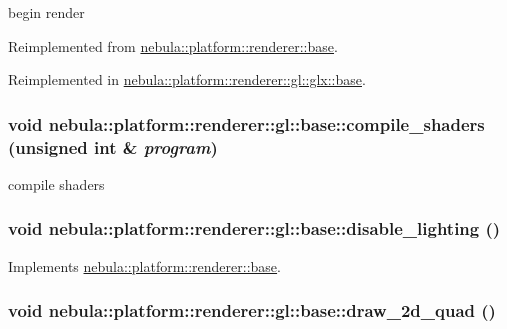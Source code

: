 begin render 

Reimplemented from \hyperlink{classnebula_1_1platform_1_1renderer_1_1base_a125a4fd0dfc31be859c37067eaada43d}{nebula::platform::renderer::base}.

Reimplemented in \hyperlink{classnebula_1_1platform_1_1renderer_1_1gl_1_1glx_1_1base_abfc5fa20a21e5278d6a49103f017c8e6}{nebula::platform::renderer::gl::glx::base}.\hypertarget{classnebula_1_1platform_1_1renderer_1_1gl_1_1base_a3f466fa1f31fee02a23a0cf094493430}{
\subsubsection[{compile\_\-shaders}]{\setlength{\rightskip}{0pt plus 5cm}void nebula::platform::renderer::gl::base::compile\_\-shaders (unsigned int \& {\em program})}}
\label{classnebula_1_1platform_1_1renderer_1_1gl_1_1base_a3f466fa1f31fee02a23a0cf094493430}


compile shaders \hypertarget{classnebula_1_1platform_1_1renderer_1_1gl_1_1base_a157b9626fd03370a47898b1c0f7bbe2e}{
\subsubsection[{disable\_\-lighting}]{\setlength{\rightskip}{0pt plus 5cm}void nebula::platform::renderer::gl::base::disable\_\-lighting ()}}
\label{classnebula_1_1platform_1_1renderer_1_1gl_1_1base_a157b9626fd03370a47898b1c0f7bbe2e}


Implements \hyperlink{classnebula_1_1platform_1_1renderer_1_1base_a31113fc53b2a1c65645f7534a8f6bfcc}{nebula::platform::renderer::base}.\hypertarget{classnebula_1_1platform_1_1renderer_1_1gl_1_1base_a007d1a2ca36da4ab31b1eeba38b6a3b0}{
\subsubsection[{draw\_\-2d\_\-quad}]{\setlength{\rightskip}{0pt plus 5cm}void nebula::platform::renderer::gl::base::draw\_\-2d\_\-quad ()}}
\label{classnebula_1_1platform_1_1renderer_1_1gl_1_1base_a007d1a2ca36da4ab31b1eeba38b6a3b0}


